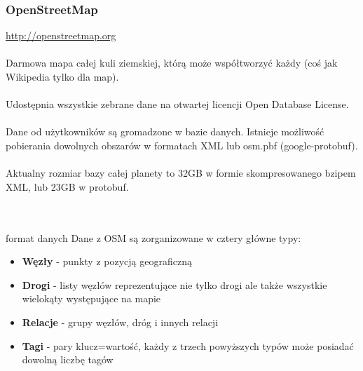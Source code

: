 \documentclass[slidestop, compress, 10pt]{beamer}
\begin{document}
        \begin{frame}[allowframebreaks]
            \frametitle{OpenStreetMap}
            \url{http://openstreetmap.org} \\
            ~ \\
            Darmowa mapa całej kuli ziemskiej, którą może współtworzyć każdy (coś jak Wikipedia tylko dla map). \\
            ~ \\
            Udostępnia wszystkie zebrane dane na otwartej licencji Open Database License. \\
            ~ \\
            Dane od użytkowników są gromadzone w bazie danych. Istnieje możliwość pobierania dowolnych obszarów w formatach XML lub osm.pbf (google-protobuf). \\
            ~ \\
            Aktualny rozmiar bazy całej planety to 32GB w formie skompresowanego bzipem XML, lub 23GB w protobuf.
            ~ \\
            ~ \\
            ~ \\
            \begin{block}{format danych}
                Dane z OSM są zorganizowane w cztery główne typy:
                \begin{itemize}
                    \item \textbf{Węzły}    - punkty z pozycją geograficzną
                    \item \textbf{Drogi}    - listy węzłów reprezentujące nie tylko drogi ale także wszystkie wielokąty występujące na mapie
                    \item \textbf{Relacje}  - grupy węzłów, dróg i innych relacji
                    \item \textbf{Tagi}     - pary klucz=wartość, każdy z trzech powyższych typów może posiadać dowolną liczbę tagów
                \end{itemize}
            \end{block}
        \end{frame}

\end{document}
